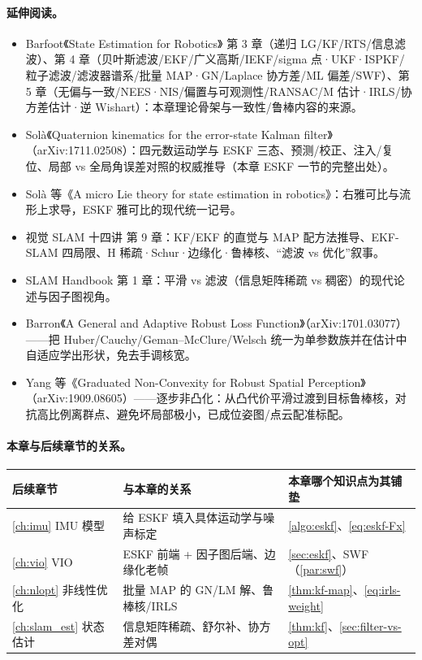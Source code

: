 \paragraph{延伸阅读。}
\begin{itemize}
  \item Barfoot《State Estimation for Robotics》\cite{barfoot2024state} 第 3 章（递归 LG/KF/RTS/信息滤波）、第 4 章（贝叶斯滤波/EKF/广义高斯/IEKF/sigma 点·UKF·ISPKF/粒子滤波/滤波器谱系/批量 MAP·GN/Laplace 协方差/ML 偏差/SWF）、第 5 章（无偏与一致/NEES·NIS/偏置与可观测性/RANSAC/M 估计·IRLS/协方差估计·逆 Wishart）：本章理论骨架与一致性/鲁棒内容的来源。
  \item Solà《Quaternion kinematics for the error-state Kalman filter》\cite{sola2017quaternion}（arXiv:1711.02508）：四元数运动学与 ESKF 三态、预测/校正、注入/复位、局部 vs 全局角误差对照的权威推导（本章 ESKF 一节的完整出处）。
  \item Solà 等《A micro Lie theory for state estimation in robotics》\cite{sola2018micro}：右雅可比与流形上求导，ESKF 雅可比的现代统一记号。
  \item 视觉 SLAM 十四讲\cite{gaoxiang2019slam14} 第 9 章：KF/EKF 的直觉与 MAP 配方法推导、EKF-SLAM 四局限、H 稀疏·Schur·边缘化·鲁棒核、“滤波 vs 优化”叙事。
  \item SLAM Handbook\cite{carlone2026handbook} 第 1 章：平滑 vs 滤波（信息矩阵稀疏 vs 稠密）的现代论述与因子图视角。
  \item Barron《A General and Adaptive Robust Loss Function》\cite{barron2019general}（arXiv:1701.03077）——把 Huber/Cauchy/Geman--McClure/Welsch 统一为单参数族并在估计中自适应学出形状，免去手调核宽。
  \item Yang 等《Graduated Non-Convexity for Robust Spatial Perception》\cite{yang2020gnc}（arXiv:1909.08605）——逐步非凸化：从凸代价平滑过渡到目标鲁棒核，对抗高比例离群点、避免坏局部极小，已成位姿图/点云配准标配。
\end{itemize}

\paragraph{本章与后续章节的关系。}
\begin{table}[ht]\centering\small
\begin{tabular}{lll}
\toprule
后续章节 & 与本章的关系 & 本章哪个知识点为其铺垫 \\
\midrule
\cref{ch:imu} IMU 模型 & 给 ESKF 填入具体运动学与噪声标定 & \cref{algo:eskf}、\cref{eq:eskf-Fx} \\
\cref{ch:vio} VIO & ESKF 前端 + 因子图后端、边缘化老帧 & \cref{sec:eskf}、SWF（\cref{par:swf}） \\
\cref{ch:nlopt} 非线性优化 & 批量 MAP 的 GN/LM 解、鲁棒核/IRLS & \cref{thm:kf-map}、\cref{eq:irls-weight} \\
\cref{ch:slam_est} 状态估计 & 信息矩阵稀疏、舒尔补、协方差对偶 & \cref{thm:kf}、\cref{sec:filter-vs-opt} \\
\bottomrule
\end{tabular}
\end{table}

